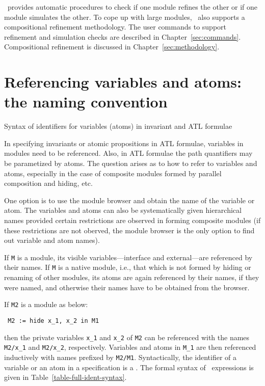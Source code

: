 \mypar
\mocha\ provides automatic procedures to check if one module refines
the other or if one module simulates the other. To cope up with
large modules, \mocha\ also supports a compositional refinement
methodology. The user commands to support refinement and simulation
checks are described in Chapter~\ref{sec:commands}. Compositional
refinement is discussed in Chapter~\ref{sec:methodology}.

\section{Referencing variables and atoms: the naming convention}
\label{sec-naming}

\begin{table}\boxed{
\begin{tabbing}
\fullident \gramdef\ \ident\ $|$ \modulename\SLASH\fullident
\end{tabbing}}
\caption{Syntax of identifiers for variables (atoms) in invariant and ATL formulae}
\label{table-full-ident-syntax}
\end{table}

In specifying invariants or atomic propositions in ATL formulae,
variables in modules need to be referenced. Also, in ATL formulae the
path quantifiers may be parametized by atoms. The question arises as
to how to refer to variables and atoms, especially in the case of
composite modules formed by parallel composition and hiding, etc. 

One option is to use the module browser and obtain the name of the variable or atom.
The variables and atoms can also be systematically given hierarchical
names provided certain restrictions are observed in forming composite
modules (if these restrictions are not oberved, the module browser 
is the only option to find out variable and atom names). 

If {\tt M} is a module, its visible variables---interface and
external---are referenced by their names. If {\tt M} is a native module,
i.e., that which is not formed by hiding or renaming of other
modules, its atoms are again referenced by their names, if they were
named, and otherwise their names have to be obtained from the browser. 

If {\tt M2} is a module as below:

\mypar
\begin{verbatim}
 M2 := hide x_1, x_2 in M1
\end{verbatim}

\mypar
then the private variables {\tt x\_1} and {\tt x\_2} of {\tt M2} can
be referenced with the names {\tt M2/x\_1} and {\tt M2/x\_2}, respectively.
Variables and atoms in {\tt M\_1} are then referenced
inductively with names prefixed by {\tt M2/M1}.
Syntactically, the identifier of a variable or an atom in a specification is a \fullident.
The formal syntax of \fullident\ expressions is given in Table~\ref{table-full-ident-syntax}.

